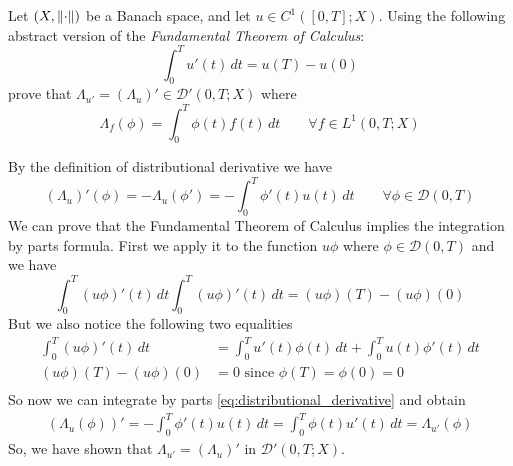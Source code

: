 \newpage
\begin{exercise}
    Let \((X, \norm{\cdot})\) be a Banach space, and let \(u \in C^1([0, T]; X)\). Using the following abstract version of the \textit{Fundamental Theorem of Calculus}:
    \[
        \int_0^T u'(t) \, dt = u(T) - u(0)
    \]
    prove that \(\Lambda_{u'} = (\Lambda_u)' \in \mathcal{D}'(0, T; X)\) where 
    \[
        \Lambda_f(\phi) = \int_0^T \phi(t) f(t) \, dt \qquad \forall f \in L^1(0, T; X)
    \]
\end{exercise}

By the definition of distributional derivative we have
\begin{equation} \label{eq:distributional_derivative}
    (\Lambda_u)'(\phi) = - \Lambda_u(\phi') =  - \int_0^T \phi'(t) u(t) \, dt \qquad \forall \phi \in \mathcal{D}(0, T)
\end{equation}
We can prove that the Fundamental Theorem of Calculus implies the integration by parts formula. 
First we apply it to the function \(u \phi\) where \(\phi \in \mathcal{D}(0, T)\) and we have
\begin{equation*}
    \int_0^T (u\phi)'(t) \, dt \int_0^T (u\phi)'(t) \, dt = (u \phi) (T) - (u \phi) (0)
\end{equation*}
But we also notice the following two equalities
\[
    \begin{split}
        \int_0^T (u\phi)'(t) \, dt &= \int_0^T u'(t) \phi(t) \, dt + \int_0^T u(t) \phi'(t) \, dt\\
        (u \phi) (T) - (u \phi) (0) &= 0 \text{ since } \phi(T) = \phi(0) = 0 \\
    \end{split}
\]
So now we can integrate by parts \eqref{eq:distributional_derivative} and obtain
\[
    \begin{split}
        (\Lambda_u(\phi))' = - \int_0^T \phi'(t) u(t) \, dt = \int_0^T \phi(t) u'(t) \, dt = \Lambda_{u'}(\phi)
    \end{split}
\]
So, we have shown that \(\Lambda_{u'} = (\Lambda_u)'\) in \(\mathcal{D}'(0, T; X)\).

\newpage
